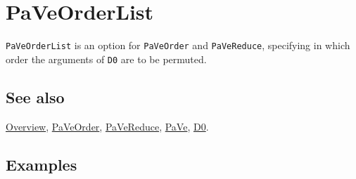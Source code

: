 \documentclass[../FeynCalcManual.tex]{subfiles}
\begin{document}
\hypertarget{paveorderlist}{%
\section{PaVeOrderList}\label{paveorderlist}}

\texttt{PaVeOrderList} is an option for \texttt{PaVeOrder} and
\texttt{PaVeReduce}, specifying in which order the arguments of
\texttt{D0} are to be permuted.

\subsection{See also}

\hyperlink{toc}{Overview}, \hyperlink{paveorder}{PaVeOrder},
\hyperlink{pavereduce}{PaVeReduce}, \hyperlink{pave}{PaVe},
\hyperlink{d0}{D0}.

\subsection{Examples}
\end{document}
